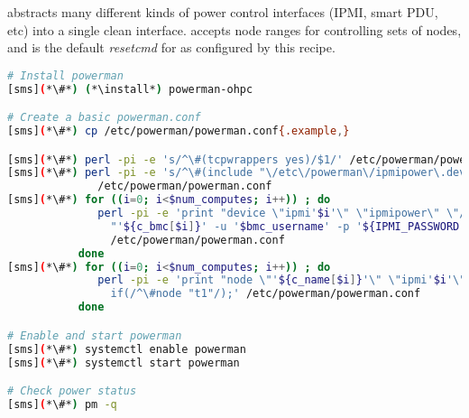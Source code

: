 \powerman{} abstracts many different kinds of power control interfaces (IPMI, 
smart PDU, etc) into a single clean interface. \powerman{} accepts node ranges
for controlling sets of nodes, and is the default {\em resetcmd} for \conman{}
as configured by this recipe.

\begin{lstlisting}[language=bash,keywords={},upquote=true]
# Install powerman
[sms](*\#*) (*\install*) powerman-ohpc

# Create a basic powerman.conf
[sms](*\#*) cp /etc/powerman/powerman.conf{.example,}

[sms](*\#*) perl -pi -e 's/^\#(tcpwrappers yes)/$1/' /etc/powerman/powerman.conf
[sms](*\#*) perl -pi -e 's/^\#(include "\/etc\/powerman\/ipmipower\.dev")/$1/' \
              /etc/powerman/powerman.conf
[sms](*\#*) for ((i=0; i<$num_computes; i++)) ; do
              perl -pi -e 'print "device \"ipmi'$i'\" \"ipmipower\" \"/usr/sbin/ipmipower -h ".
                "'${c_bmc[$i]}' -u '$bmc_username' -p '${IPMI_PASSWORD:-undefined}'|&\"\n" if(/^\#device "ipmi1"/);' \
                /etc/powerman/powerman.conf
           done
[sms](*\#*) for ((i=0; i<$num_computes; i++)) ; do
              perl -pi -e 'print "node \"'${c_name[$i]}'\" \"ipmi'$i'\" \"'${c_bmc[$i]}'\"\n"
                if(/^\#node "t1"/);' /etc/powerman/powerman.conf
           done

# Enable and start powerman
[sms](*\#*) systemctl enable powerman
[sms](*\#*) systemctl start powerman

# Check power status
[sms](*\#*) pm -q
\end{lstlisting}

